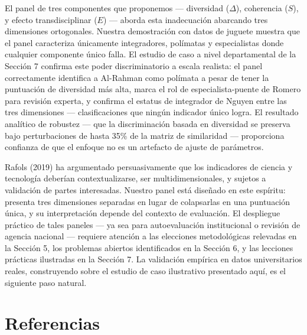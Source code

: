 \documentclass[
]{article}
\begin{document}
El panel de tres componentes que proponemos --- diversidad (\(\Delta\)),
coherencia (\(S\)), y efecto transdisciplinar (\(E\)) --- aborda esta
inadecuación abarcando tres dimensiones ortogonales. Nuestra
demostración con datos de juguete muestra que el panel caracteriza
únicamente integradores, polímatas y especialistas donde cualquier
componente único falla. El estudio de caso a nivel departamental de la
Sección 7 confirma este poder discriminatorio a escala realista: el
panel correctamente identifica a Al-Rahman como polímata a pesar de
tener la puntuación de diversidad más alta, marca el rol de
especialista-puente de Romero para revisión experta, y confirma el
estatus de integrador de Nguyen entre las tres dimensiones ---
clasificaciones que ningún indicador único logra. El resultado analítico
de robustez --- que la discriminación basada en diversidad se preserva
bajo perturbaciones de hasta 35\% de la matriz de similaridad ---
proporciona confianza de que el enfoque no es un artefacto de ajuste de
parámetros.

Rafols (2019) ha argumentado persuasivamente que los indicadores de
ciencia y tecnología deberían contextualizarse, ser multidimensionales,
y sujetos a validación de partes interesadas. Nuestro panel está
diseñado en este espíritu: presenta tres dimensiones separadas en lugar
de colapsarlas en una puntuación única, y su interpretación depende del
contexto de evaluación. El despliegue práctico de tales paneles --- ya
sea para autoevaluación institucional o revisión de agencia nacional ---
requiere atención a las elecciones metodológicas relevadas en la Sección
5, los problemas abiertos identificados en la Sección 6, y las lecciones
prácticas ilustradas en la Sección 7. La validación empírica en datos
universitarios reales, construyendo sobre el estudio de caso ilustrativo
presentado aquí, es el siguiente paso natural.

\hypertarget{referencias}{%
\section{Referencias}\label{referencias}}
\end{document}
